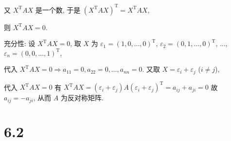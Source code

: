 		 又 \( X^{\mathrm{T}}AX \) 是一个数, 于是 \( (X^{\mathrm{T}}AX)^{\mathrm{T}} = X^{\mathrm{T}}AX \),

		 则 \( X^{\mathrm{T}}AX = 0 \).

		 充分性: 设 \( X^{\mathrm{T}}AX = 0 \), 取 \( X \) 为 \( \varepsilon_{1} = (1, 0, \dots, 0)^{\mathrm{T}} \), \( \varepsilon_{2} = (0, 1, \dots, 0)^{\mathrm{T}} \), ..., \( \varepsilon_{n} = (0, 0, \dots, 1)^{\mathrm{T}} \),

		 代入 \( X^{\mathrm{T}}AX = 0 \Rightarrow a_{11} = 0, a_{22} = 0, \dots, a_{nn} = 0. \)
		 又取 \( X = \varepsilon_{i} + \varepsilon_{j} \) (\( i \neq j \)),

		 代入 \( X^{\mathrm{T}}AX = 0 \) 有 \( X^{\mathrm{T}}AX = (\varepsilon_{i} + \varepsilon_{j})A(\varepsilon_{i} + \varepsilon_{j})^{\mathrm{T}} = a_{ij} + a_{ji} = 0 \)
		 故 \( a_{ij} = -a_{ji} \), 从而 \( A \) 为反对称矩阵.


\section{6.2}

 \subsection{} %


